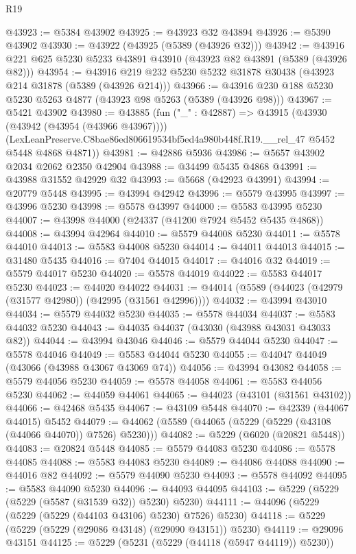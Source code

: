 \begin{lexlean}{R19}
\begin{coremodule}
@43923 := @5384 @43902
@43925 := @43923 @32 @43894
@43926 := @5390 @43902
@43930 := @43922 (@43925 (@5389 (@43926 @32)))
@43942 := @43916 @221 @625 @5230 @5233 @43891 @43910 (@43923 @82 @43891 (@5389 (@43926 @82)))
@43954 := @43916 @219 @232 @5230 @5232 @31878 @30438 (@43923 @214 @31878 (@5389 (@43926 @214)))
@43966 := @43916 @230 @188 @5230 @5230 @5263 @4877 (@43923 @98 @5263 (@5389 (@43926 @98)))
@43967 := @5421 @43902
@43980 := @43885
    (fun ("_" : @42887) =>
    @43915
      (@43930 (@43942 (@43954 (@43966 @43967))))
      (LexLeanPreserve.C8bae86ed806619534bf5ed4a980b448f.R19.__rel_47 @5452 @5448 @4868 @4871))
@43981 := @42886 @5936
@43986 := @5657 @43902 @2034 @2062 @2350 @42904
@43988 := @34499 @5435 @4868
@43991 := @43988 @31552 @42929 @32
@43993 := @5668 (@42923 @43991)
@43994 := @20779 @5448
@43995 := @43994 @42942
@43996 := @5579 @43995
@43997 := @43996 @5230
@43998 := @5578 @43997
@44000 := @5583 @43995 @5230
@44007 := @43998 @44000 (@24337 (@41200 @7924 @5452 @5435 @4868))
@44008 := @43994 @42964
@44010 := @5579 @44008 @5230
@44011 := @5578 @44010
@44013 := @5583 @44008 @5230
@44014 := @44011 @44013
@44015 := @31480 @5435
@44016 := @7404 @44015
@44017 := @44016 @32
@44019 := @5579 @44017 @5230
@44020 := @5578 @44019
@44022 := @5583 @44017 @5230
@44023 := @44020 @44022
@44031 := @44014 (@5589 (@44023 (@42979 (@31577 @42980)) (@42995 (@31561 @42996))))
@44032 := @43994 @43010
@44034 := @5579 @44032 @5230
@44035 := @5578 @44034
@44037 := @5583 @44032 @5230
@44043 := @44035 @44037 (@43030 (@43988 @43031 @43033 @82))
@44044 := @43994 @43046
@44046 := @5579 @44044 @5230
@44047 := @5578 @44046
@44049 := @5583 @44044 @5230
@44055 := @44047 @44049 (@43066 (@43988 @43067 @43069 @74))
@44056 := @43994 @43082
@44058 := @5579 @44056 @5230
@44059 := @5578 @44058
@44061 := @5583 @44056 @5230
@44062 := @44059 @44061
@44065 := @44023 (@43101 (@31561 @43102))
@44066 := @42468 @5435
@44067 := @43109 @5448
@44070 := @42339 (@44067 @44015) @5452
@44079 := @44062 (@5589 (@44065 (@5229 (@5229 (@43108 (@44066 @44070)) @7526) @5230)))
@44082 := @5229 (@6020 (@20821 @5448))
@44083 := @20824 @5448
@44085 := @5579 @44083 @5230
@44086 := @5578 @44085
@44088 := @5583 @44083 @5230
@44089 := @44086 @44088
@44090 := @44016 @82
@44092 := @5579 @44090 @5230
@44093 := @5578 @44092
@44095 := @5583 @44090 @5230
@44096 := @44093 @44095
@44103 := @5229 (@5229 (@5229 (@5587 (@31539 @32)) @5230) @5230)
@44111 := @44096 (@5229 (@5229 (@5229 (@44103 @43106) @5230) @7526) @5230)
@44118 := @5229 (@5229 (@5229 (@29086 @43148) (@29090 @43151)) @5230)
@44119 := @29096 @43151
@44125 := @5229 (@5231 (@5229 (@44118 (@5947 @44119)) @5230))

\end{coremodule}
\end{lexlean}
